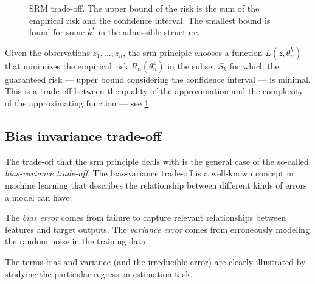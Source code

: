 \begin{figure}
  \centering
  \caption{
  SRM trade-off.
  The upper bound of the risk is the sum of the empirical risk and the confidence
  interval.  The smallest bound is found for some $k^*$ in the admissible structure.
  }
  \label{fig:srm-tradeoff}
\end{figure}

Given the observations $z_1, \dots, z_n$, the \gls{srm} principle chooses a function
$L(z, \theta_n^k)$ that minimizes the empirical risk $R_n(\theta_n^k)$ in the subset
$S_k$ for which the guaranteed risk --- upper bound considering the confidence interval
--- is minimal.  This is a trade-off between the quality of the approximation and the
complexity of the approximating function --- see \cref{fig:srm-tradeoff}.

\subsection{Bias invariance trade-off}

The trade-off that the \gls{srm} principle deals with is the general case of the so-called
\emph{bias-variance trade-off}.  The bias-variance trade-off is a well-known concept in
machine learning that describes the relationship between different kinds of errors a model
can have.

The \emph{bias error} comes from failure to capture relevant relationships between features
and target outputs.  The \emph{variance error} comes from erroneously modeling the random
noise in the training data.

The terms bias and variance (and the irreducible error) are clearly illustrated by
studying the particular regression estimation task.

